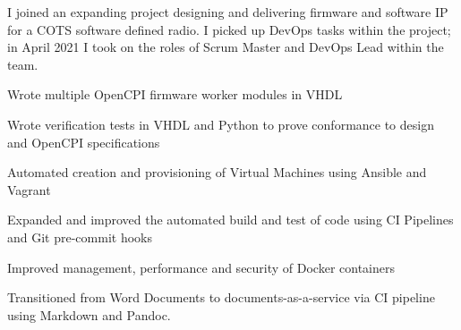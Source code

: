 \sectionsep
{}
I joined an expanding project designing and delivering firmware and software IP for a COTS software defined radio. I picked up DevOps tasks within the project; in April 2021 I took on the roles of Scrum Master and DevOps Lead within the team.
\vspace{0.25em}
\begin{tightemize}
    \item Wrote multiple OpenCPI firmware worker modules in VHDL
    \item Wrote verification tests in VHDL and Python to prove conformance to design and OpenCPI specifications
    \item Automated creation and provisioning of Virtual Machines using Ansible and Vagrant
    \item Expanded and improved the automated build and test of code using CI Pipelines and Git pre-commit hooks
    \item Improved management, performance and security of Docker containers
    \item Transitioned from Word Documents to documents-as-a-service via CI pipeline using Markdown and Pandoc.
\end{tightemize}
\sectionsep
